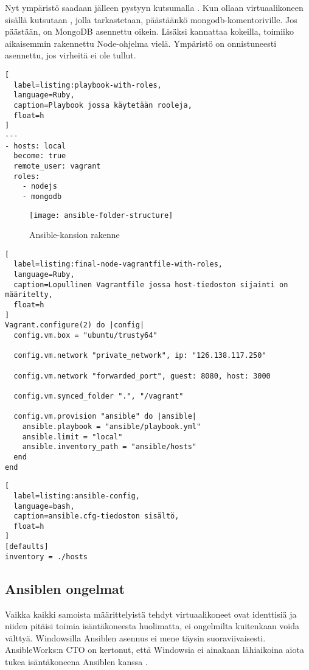 Nyt ympäristö saadaan jälleen pystyyn kutsumalla . Kun ollaan virtuaalikoneen sisällä kutsutaan , jolla tarkastetaan, päästäänkö mongodb-komentoriville. Jos päästään, on MongoDB asennettu oikein. Lisäksi kannattaa kokeilla, toimiiko aikaisemmin rakennettu Node-ohjelma vielä. Ympäristö on onnistuneesti asennettu, jos virheitä ei ole tullut.

\begin{lstlisting}[
  label=listing:playbook-with-roles,
  language=Ruby,
  caption=Playbook jossa käytetään rooleja,
  float=h
]
---
- hosts: local
  become: true
  remote_user: vagrant
  roles:
    - nodejs
    - mongodb
\end{lstlisting}

\begin{figure}[h]
  \texttt{[image: ansible-folder-structure]}
  \caption{Ansible-kansion rakenne}
  \label{fig:ansible-folder-structure}
\end{figure}

\begin{lstlisting}[
  label=listing:final-node-vagrantfile-with-roles,
  language=Ruby,
  caption=Lopullinen Vagrantfile jossa host-tiedoston sijainti on määritelty,
  float=h
]
Vagrant.configure(2) do |config|
  config.vm.box = "ubuntu/trusty64"

  config.vm.network "private_network", ip: "126.138.117.250"

  config.vm.network "forwarded_port", guest: 8080, host: 3000

  config.vm.synced_folder ".", "/vagrant"

  config.vm.provision "ansible" do |ansible|
    ansible.playbook = "ansible/playbook.yml"
    ansible.limit = "local"
    ansible.inventory_path = "ansible/hosts"
  end
end
\end{lstlisting}

\begin{lstlisting}[
  label=listing:ansible-config,
  language=bash,
  caption=ansible.cfg-tiedoston sisältö,
  float=h
]
[defaults]
inventory = ./hosts
\end{lstlisting}

\subsection{Ansiblen ongelmat}

Vaikka kaikki samoista määrittelyistä tehdyt virtuaalikoneet ovat identtisiä ja niiden pitäisi toimia isäntäkoneesta huolimatta, ei ongelmilta kuitenkaan voida välttyä. Windowsilla Ansiblen asennus ei mene täysin suoraviivaisesti. AnsibleWorks:n CTO on kertonut, että Windowsia ei ainakaan lähiaikoina aiota tukea isäntäkoneena Ansiblen kanssa \cite{link:windows-support-for-ansible}.

